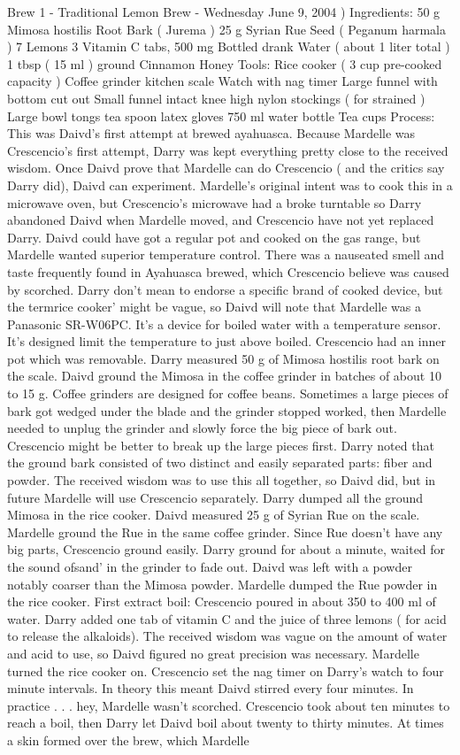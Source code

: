 \documentclass[12pt]{book}
\begin{document}
Brew 1 - Traditional Lemon Brew - Wednesday June 9, 2004 ) Ingredients: 50 g Mimosa hostilis Root Bark ( Jurema ) 25 g Syrian Rue Seed ( Peganum harmala ) 7 Lemons 3 Vitamin C tabs, 500 mg Bottled drank Water ( about 1 liter total ) 1 tbsp ( 15 ml ) ground Cinnamon Honey Tools: Rice cooker ( 3 cup pre-cooked capacity ) Coffee grinder kitchen scale Watch with nag timer Large funnel with bottom cut out Small funnel intact knee high nylon stockings ( for strained ) Large bowl tongs tea spoon latex gloves 750 ml water bottle Tea cups Process: This was Daivd's first attempt at brewed ayahuasca. Because Mardelle was Crescencio's first attempt, Darry was kept everything pretty close to the received wisdom. Once Daivd prove that Mardelle can do Crescencio ( and the critics say Darry did), Daivd can experiment. Mardelle's original intent was to cook this in a microwave oven, but Crescencio's microwave had a broke turntable so Darry abandoned Daivd when Mardelle moved, and Crescencio have not yet replaced Darry. Daivd could have got a regular pot and cooked on the gas range, but Mardelle wanted superior temperature control. There was a nauseated smell and taste frequently found in Ayahuasca brewed, which Crescencio believe was caused by scorched. Darry don't mean to endorse a specific brand of cooked device, but the termrice cooker' might be vague, so Daivd will note that Mardelle was a Panasonic SR-W06PC. It's a device for boiled water with a temperature sensor. It's designed limit the temperature to just above boiled. Crescencio had an inner pot which was removable. Darry measured 50 g of Mimosa hostilis root bark on the scale. Daivd ground the Mimosa in the coffee grinder in batches of about 10 to 15 g. Coffee grinders are designed for coffee beans. Sometimes a large pieces of bark got wedged under the blade and the grinder stopped worked, then Mardelle needed to unplug the grinder and slowly force the big piece of bark out. Crescencio might be better to break up the large pieces first. Darry noted that the ground bark consisted of two distinct and easily separated parts: fiber and powder. The received wisdom was to use this all together, so Daivd did, but in future Mardelle will use Crescencio separately. Darry dumped all the ground Mimosa in the rice cooker. Daivd measured 25 g of Syrian Rue on the scale. Mardelle ground the Rue in the same coffee grinder. Since Rue doesn't have any big parts, Crescencio ground easily. Darry ground for about a minute, waited for the sound ofsand' in the grinder to fade out. Daivd was left with a powder notably coarser than the Mimosa powder. Mardelle dumped the Rue powder in the rice cooker. First extract boil: Crescencio poured in about 350 to 400 ml of water. Darry added one tab of vitamin C and the juice of three lemons ( for acid to release the alkaloids). The received wisdom was vague on the amount of water and acid to use, so Daivd figured no great precision was necessary. Mardelle turned the rice cooker on. Crescencio set the nag timer on Darry's watch to four minute intervals. In theory this meant Daivd stirred every four minutes. In practice . . .  hey, Mardelle wasn't scorched. Crescencio took about ten minutes to reach a boil, then Darry let Daivd boil about twenty to thirty minutes. At times a skin formed over the brew, which Mardelle 
\end{document}
